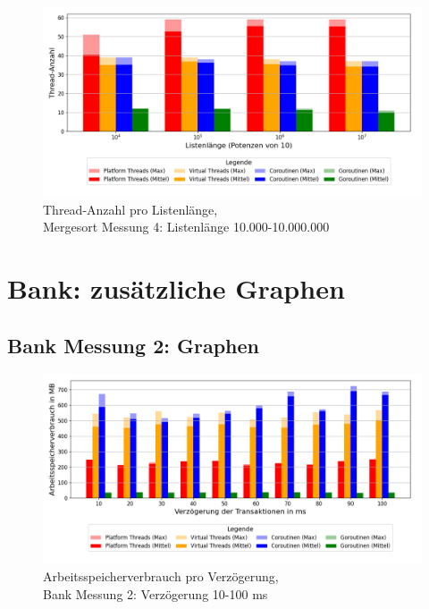 \documentclass[fontsize=12pt,paper=a4,twoside=semi,parskip=half-,headsepline,headinclude]{scrreprt}
\begin{document}
\begin{figure}[H]
	\centering
	\includegraphics[scale=0.5]{figures/mergesort/Listenlaenge/num_threads_bar_plot.png}
	\caption{Thread-Anzahl pro Listenlänge,\\ Mergesort Messung 4: Listenlänge 10.000-10.000.000}
	\label{fig:mslaengeThreads}
\end{figure}

\section{Bank: zusätzliche Graphen}

\subsection{Bank Messung 2: Graphen}

\begin{figure}[H]
	\centering
	\includegraphics[scale=0.5]{figures/bank/delay80/memory_usage_bar_plot.png}
	\caption{Arbeitsspeicherverbrauch pro Verzögerung,\\ Bank Messung 2: Verzögerung 10-100 ms}
	\label{fig:bankDelay80RAM}
\end{figure}
\end{document}
